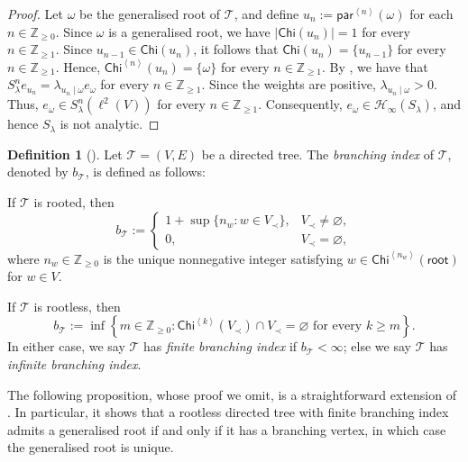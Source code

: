 \documentclass[11pt, reqno, a4paper]{amsart}
\theoremstyle{definition}
\newtheorem{definition}[theorem]{Definition}
\newcommand{\calH}{{\mathcal{H}}}
\newcommand{\scrT}{{\mathscr T}}
\newcommand{\ip}[1]{\left\langle #1 \right\rangle}
\newcommand{\abs}[1]{\left\lvert #1 \right\rvert}
\renewcommand{\ge}{\geqslant}
\newcommand{\Z}{\mathbb Z}
\newcommand{\Chi}{\mathsf{Chi}}
\newcommand{\pr}{\mathsf{par}}
\numberwithin{equation}{section}
\begin{document}
\begin{proof}
    Let $\omega$ be the generalised root of $\scrT$, and define $u_n:=\pr^{\ip{n}}(\omega)$ for each $n\in\Z_{\ge 0}$. Since $\omega$ is a generalised root, we have $\abs{\Chi(u_n)}=1$ for every $n\in\Z_{\ge 1}$. Since $u_{n-1}\in\Chi(u_n)$, it follows that $\Chi(u_n)=\{u_{n-1}\}$ for every $n\in\Z_{\ge 1}$. Hence, $\Chi^{\ip{n}}(u_n)=\{\omega\}$ for every $n\in\Z_{\ge 1}$. By , we have that $S_{\lambda}^{n}e_{u_n}=\lambda_{u_n\mid\omega}e_{\omega}$ for every $n\in\Z_{\ge 1}$. Since the weights are positive, $\lambda_{u_n\mid\omega}>0$. Thus, $e_{\omega}\in S_{\lambda}^{n}(\ell^2(V))$ for every $n\in\Z_{\ge 1}$. Consequently, $e_{\omega}\in\calH_{\infty}(S_{\lambda})$, and hence $S_{\lambda}$ is not analytic.
\end{proof}

\begin{definition}[{\cite[Definitions 1 and 3]{MR3532172}}]
    Let $\scrT=( V, E)$ be a directed tree. The \emph{branching index} of $\scrT$, denoted by $b_{\scrT}$, is defined as follows:

    If $\scrT$ is rooted, then
    \begin{equation*}
        b_{\scrT} := \begin{cases}
            1+\sup\{n_w:w\in V_{\prec}\}, &  V_{\prec}\ne\varnothing,\\
            0, &  V_{\prec}=\varnothing,
        \end{cases}
    \end{equation*}
    where $n_w \in \Z_{\ge 0}$ is the unique nonnegative integer satisfying $w \in \Chi ^{\ip{n_w}} (\mathsf{root})$ for $w \in  V$.

    If $\scrT$ is rootless, then
    \begin{equation*}
        b_{\scrT} := \inf \left\{ m\in\Z_{\ge 0}: \Chi^{\ip{k}}( V_{\prec})\cap V_{\prec} =\varnothing \text{ for every } k\ge m \right\}.
    \end{equation*}
    In either case, we say $\scrT$ has \textit{finite branching index} if $b_{\scrT} < \infty$; else we say $\scrT$ has \textit{infinite branching index}.
\end{definition}

The following proposition, whose proof we omit, is a straightforward extension of \cite[Lemma 6.1]{MR3532172}. In particular, it shows that a rootless directed tree with finite branching index admits a generalised root if and only if it has a branching vertex, in which case the generalised root is unique.
\end{document}

